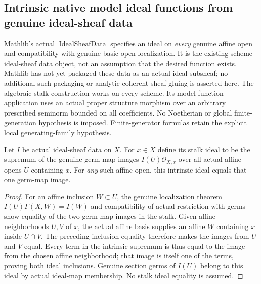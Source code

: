 \subsection{Intrinsic native model ideal functions from genuine ideal-sheaf data}
\label{subsec:native-model-ideals}

Mathlib's actual $\operatorname{IdealSheafData}$ specifies an ideal on
\emph{every} genuine affine open and compatibility with genuine basic-open
localization. It is the existing scheme ideal-sheaf data object, not an
assumption that the desired function exists. Mathlib has not yet packaged
these data as an actual ideal subsheaf; no additional such packaging or
analytic coherent-sheaf gluing is asserted here. The algebraic stalk
construction works on every scheme. Its model-function application uses
an actual proper structure morphism over an arbitrary prescribed seminorm
bounded on all coefficients. No Noetherian or global finite-generation
hypothesis is imposed. Finite-generator formulas retain the explicit
local generating-family hypothesis.

\begin{definition}
\label{scheme:ideal-sheaf-data-stalk}
\leanok
Let $I$ be actual ideal-sheaf data on $X$. For $x\in X$ define its stalk
ideal to be the supremum of the genuine germ-map images $I(U)\mathcal O_{X,x}$
over all actual affine opens $U$ containing $x$. For \emph{any} such affine
open, this intrinsic ideal equals that one germ-map image.
\end{definition}
\begin{proof}
For an affine inclusion $W\subset U$, the genuine localization theorem
$I(U)\Gamma(X,W)=I(W)$ and compatibility of actual restriction with germs
show equality of the two germ-map images in the stalk. Given affine
neighborhoods $U,V$ of $x$, the actual affine basis supplies an affine
$W$ containing $x$ inside $U\cap V$. The preceding inclusion equality
therefore makes the images from $U$ and $V$ equal. Every term in the
intrinsic supremum is thus equal to the image from the chosen affine
neighborhood; that image is itself one of the terms, proving both ideal
inclusions. Genuine section germs of $I(U)$ belong to this ideal by
actual ideal-map membership. No stalk ideal equality is assumed.
\end{proof}

